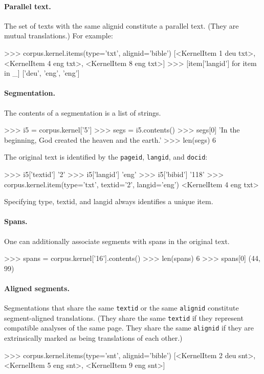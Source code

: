 \paragraph{Parallel text.}
The set of texts with the same alignid constitute a parallel text.  (They are
mutual translations.)  For example:
\begin{python}
>>> corpus.kernel.items(type='txt', alignid='bible')
[<KernelItem 1 deu txt>, <KernelItem 4 eng txt>, <KernelItem 8 eng txt>]
>>> [item['langid'] for item in _]
['deu', 'eng', 'eng']
\end{python}

\paragraph{Segmentation.}
The contents of a segmentation is a list of strings.
\begin{python}
>>> i5  = corpus.kernel['5']
>>> segs = i5.contents()
>>> segs[0]
'In the beginning, God created the heaven and the earth.'
>>> len(segs)
6
\end{python}
The original text is identified by the {\tt pageid}, {\tt langid}, and
{\tt docid}:
\begin{python}
>>> i5['textid']
'2'
>>> i5['langid']
'eng'
>>> i5['bibid']
'118'
>>> corpus.kernel.item(type='txt', textid='2', langid='eng')
<KernelItem 4 eng txt>
\end{python}
Specifying type, textid, and langid always identifies a unique
item.

\paragraph{Spans.}
One can additionally associate segments with spans in the original
text.
\begin{python}
>>> spans = corpus.kernel['16'].contents()
>>> len(spans)
6
>>> spans[0]
(44, 99)
\end{python}

\paragraph{Aligned segments.}
Segmentations that share the same {\tt textid} or the same
{\tt alignid} constitute segment-aligned translations.  (They share
the same {\tt textid} if they represent compatible analyses of the
same page.  They share the same {\tt alignid} if they are
extrinsically marked as being translations of each other.)
\begin{python}
>>> corpus.kernel.items(type='snt', alignid='bible')
[<KernelItem 2 deu snt>, <KernelItem 5 eng snt>, <KernelItem 9 eng snt>]
\end{python}

